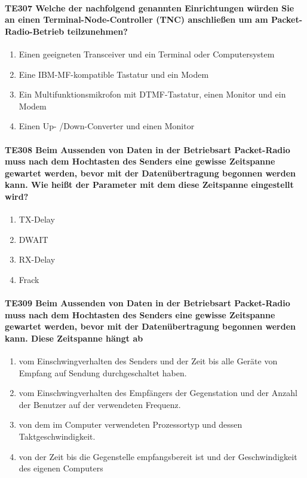 \documentclass[8pt]{article}
\begin{document}
\begin{enumerate}
\begin{enumerate}[nolistsep,label=\Alph*]
\paragraph*{TE307 Welche der nachfolgend genannten Einrichtungen würden Sie an einen Terminal-Node-Controller (TNC) anschließen um am Packet-Radio-Betrieb teilzunehmen?}
\begin{enumerate}[nolistsep,label=\Alph*]
\item Einen geeigneten Transceiver und ein Terminal oder Computersystem
\item Eine IBM-MF-kompatible Tastatur und ein Modem 
\item Ein Multifunktionsmikrofon mit DTMF-Tastatur, einen Monitor und ein Modem
\item Einen Up- /Down-Converter und einen Monitor 
\end{enumerate}

\paragraph*{TE308 Beim Aussenden von Daten in der Betriebsart Packet-Radio muss nach dem Hochtasten des Senders eine gewisse Zeitspanne gewartet werden, bevor mit der Datenübertragung begonnen werden kann. Wie heißt der Parameter mit dem diese Zeitspanne eingestellt wird?}
\begin{enumerate}[nolistsep,label=\Alph*]
\item TX-Delay
\item DWAIT
\item RX-Delay
\item Frack
\end{enumerate}

\paragraph*{TE309 Beim Aussenden von Daten in der Betriebsart Packet-Radio muss nach dem Hochtasten des Senders eine gewisse Zeitspanne gewartet werden, bevor mit der Datenübertragung begonnen werden kann. Diese Zeitspanne hängt ab}
\begin{enumerate}[nolistsep,label=\Alph*]
\item vom Einschwingverhalten des Senders und der Zeit bis alle Geräte von Empfang auf Sendung durchgeschaltet haben.
\item vom Einschwingverhalten des Empfängers der Gegenstation und der Anzahl der Benutzer auf der verwendeten Frequenz.
\item von dem im Computer verwendeten Prozessortyp und dessen Taktgeschwindigkeit.
\item von der Zeit bis die Gegenstelle empfangsbereit ist und der Geschwindigkeit des eigenen Computers
\end{enumerate}


\end{enumerate}
\end{enumerate}
\end{document}
